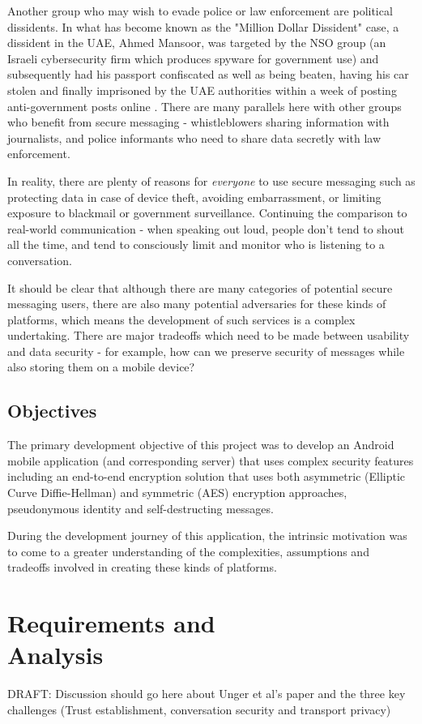 \documentclass{mproj}
\begin{document}
Another group who may wish to evade police or law enforcement are political dissidents. In what has become known as the "Million Dollar Dissident" \cite{marczak2018hide} case, a dissident in the UAE, Ahmed Mansoor, was targeted by the NSO group (an Israeli cybersecurity firm which produces spyware for government use) and subsequently had his passport confiscated as well as being beaten, having his car stolen and finally imprisoned by the UAE authorities within a week of posting anti-government posts online \cite{mazzetti2019new}. There are many parallels here with other groups who benefit from secure messaging - whistleblowers sharing information with journalists, and police informants who need to share data secretly with law enforcement. 

In reality, there are plenty of reasons for \emph{everyone} to use secure messaging such as protecting data in case of device theft, avoiding embarrassment, or limiting exposure to blackmail or government surveillance. Continuing the comparison to real-world communication - when speaking out loud, people don't tend to shout all the time, and tend to consciously limit and monitor who is listening to a conversation.

It should be clear that although there are many categories of potential secure messaging users, there are also many potential adversaries for these kinds of platforms, which means the development of such services is a complex undertaking. There are major tradeoffs which need to be made between usability and data security - for example, how can we preserve security of messages while also storing them on a mobile device? 

\section{Objectives}
The primary development objective of this project was to develop an Android mobile application (and corresponding server) that uses complex security features including an end-to-end encryption solution that uses both asymmetric (Elliptic Curve Diffie-Hellman) and symmetric (AES) encryption approaches, pseudonymous identity and self-destructing messages. 

During the development journey of this application, the intrinsic motivation was to come to a greater understanding of the complexities, assumptions and tradeoffs involved in creating these kinds of platforms. 

\chapter{Requirements and \\ Analysis}\label{analysis}
DRAFT: Discussion should go here about Unger et al's paper and the three key challenges (Trust establishment, conversation security and transport privacy)\cite{unger2015sok}
\end{document}
